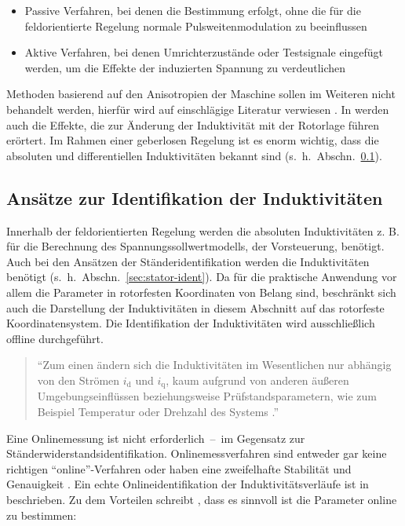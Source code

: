 \documentclass[conference,twocolumn]{IEEEtran}
\newcommand{\x}[1]{\mathrm{#1}}
\begin{document}
\begin{itemize}
\item Passive Verfahren, bei denen die Bestimmung erfolgt, ohne die für die feldorientierte Regelung normale Pulsweitenmodulation zu beeinflussen
\item Aktive Verfahren, bei denen Umrichterzustände oder Testsignale eingefügt werden, um die Effekte der induzierten Spannung zu verdeutlichen
\end{itemize}

Methoden basierend auf den Anisotropien der Maschine sollen im Weiteren nicht behandelt werden, hierfür wird auf einschlägige Literatur verwiesen \autocites{Perassi2006}{kiel2005}.
In \textcite{kiel2005} werden auch die Effekte, die zur Änderung der Induktivität mit der Rotorlage führen erörtert.
Im Rahmen einer geberlosen Regelung ist es enorm wichtig, dass die absoluten und differentiellen Induktivitäten bekannt sind (s.~h.~Abschn.~\ref{sec:induktiv}).

\subsection{Ansätze zur Identifikation der Induktivitäten}\label{sec:induktiv}

Innerhalb der feldorientierten Regelung werden die absoluten Induktivitäten z. B. für die Berechnung des Spannungssollwertmodells, der Vorsteuerung, benötigt.
Auch bei den Ansätzen der Ständeridentifikation werden die Induktivitäten benötigt (s.~h.~Abschn.~\ref{sec:stator-ident}).
Da für die praktische Anwendung vor allem die Parameter in rotorfesten Koordinaten von Belang sind, beschränkt sich auch die Darstellung der Induktivitäten in diesem Abschnitt auf das rotorfeste Koordinatensystem.
Die Identifikation der Induktivitäten wird ausschließlich offline durchgeführt.

\begin{quote}
\enquote{Zum einen ändern sich die Induktivitäten im Wesentlichen nur abhängig von den Strömen $i_\x{d}$ und $i_\x{q}$, kaum aufgrund von anderen äußeren Umgebungseinflüssen beziehungsweise Prüfstandsparametern, wie zum Beispiel Temperatur oder Drehzahl des Systems \autocite[S.~79]{Kellner2012}.}
\end{quote}

Eine Onlinemessung ist nicht erforderlich~--~im Gegensatz zur Ständerwiderstandsidentifikation.
Onlinemessverfahren sind entweder gar keine richtigen \enquote{online}-Verfahren oder haben eine zweifelhafte Stabilität und Genauigkeit \autocite{underwood_online_2010}.
Ein echte Onlineidentifikation der Induktivitätsverläufe ist in \autocite{underwood_online_2010} beschrieben.
Zu dem Vorteilen schreibt \textcite{underwood_online_2010}, dass es sinnvoll ist die Parameter online zu bestimmen:
\end{document}
